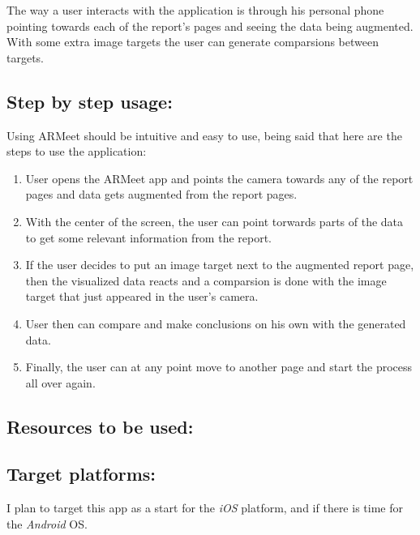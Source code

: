 \documentclass{article}
\begin{document}
The way a user interacts with the application is through his personal
phone pointing towards each of the report's pages and seeing the data being
augmented. With some extra image targets the user can generate comparsions
between targets.

\subsection{Step by step usage:}
Using ARMeet should be intuitive and easy to use, being said that here are
the steps to use the application:
\begin{enumerate}
\item User opens the ARMeet app and points the camera towards any of the
  report pages and data gets augmented from the report pages.
\item With the center of the screen, the user can point torwards parts of the data to
  get some relevant information from the report.
\item If the user decides to put an image target next to the augmented report
  page, then the visualized data reacts and a comparsion is done with the
  image target that just appeared in the user's camera.
\item User then can compare and make conclusions on his own with the
  generated data.
\item Finally, the user can at any point move to another page and start the
  process all over again.
\end{enumerate}

\subsection{Resources to be used:}

\subsection{Target platforms:}
I plan to target this app as a start for the \textit{iOS} platform, and
if there is time for the \textit{Android} OS.
\end{document}
